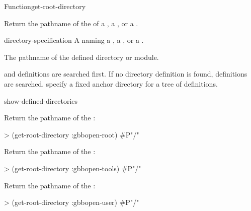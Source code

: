\documentclass[10pt,twoside,english,pdftex]{article}
\begin{document}

\begin{functiondoc}{Function}{get-root-directory}{
    \returns{} }
%

\fnsyntax 

\fnpurpose Return the pathname of the  of a
, a , or a .

\fnpackage {}

\fnmodule {}

\fnargs
\begin{args}{directory-specification}
\arg[name] A  naming a , a
, or a .
\end{args}

\fnreturns The  pathname of the defined directory or
module.

\fndescription {} and  definitions are
searched first.  If no  directory definition is found,
 definitions are searched.   specify a
fixed anchor directory for a tree of  definitions.

\begin{alsos}{show-defined-directories}
\end{alsos}

\fnexamples
%
Return the  pathname of the  
:
%
\W\supp
\begin{example}
> (get-root-directory :gbbopen-root)
#P"/"
\end{example}
%
Return the  pathname of the  
:
%
\W\supp\notpretop
\begin{example}
> (get-root-directory :gbbopen-tools)
#P"/"
\end{example}
Return the  pathname of the  
:
%
\W\supp\notpretop
\begin{example}
> (get-root-directory :gbbopen-user)
#P"/"
\end{example}

\end{functiondoc}
\end{document}
